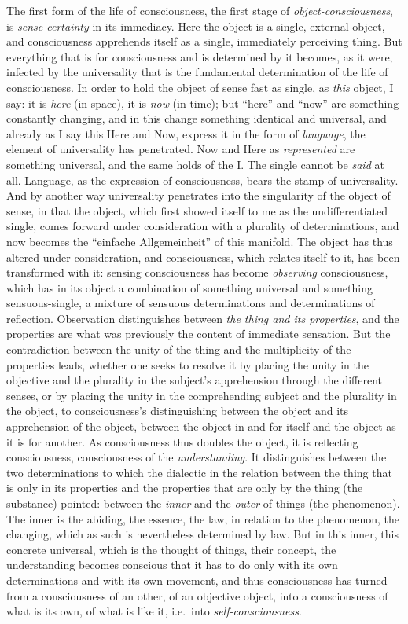 The first form of the life of consciousness, the first stage of
\emph{object-consciousness}, is \emph{sense-certainty} in its immediacy.
Here the object is a single, external object, and consciousness
apprehends itself as a single, immediately perceiving thing. But
everything that is for consciousness and is determined by it becomes,
as it were, infected by the universality that is the fundamental
determination of the life of consciousness. In order to hold the object
of sense fast as single, as \emph{this} object, I say: it is \emph{here}
(in space), it is \emph{now} (in time); but ``here'' and ``now'' are
something constantly changing, and in this change something identical
and universal, and already as I say this Here and Now, express it in
the form of \emph{language}, the element of universality has
penetrated. Now and Here as \emph{represented} are something universal,
and the same holds of the I. The single cannot be \emph{said} at all.
Language, as the expression of consciousness, bears the stamp of
universality. And by another way universality penetrates into the
singularity of the object of sense, in that the object, which first
showed itself to me as the undifferentiated single, comes forward under
consideration with a plurality of determinations, and now becomes the
``einfache Allgemeinheit'' of this manifold. The object has thus altered
under consideration, and consciousness, which relates itself to it, has
been transformed with it: sensing consciousness has become
\emph{observing} consciousness, which has in its object a combination of
something universal and something sensuous-single, a mixture of
sensuous determinations and determinations of reflection. Observation
distinguishes between \emph{the thing and its properties}, and the
properties are what was previously the content of immediate sensation.
But the contradiction between the unity of the thing and the
multiplicity of the properties leads, whether one seeks to resolve it
by placing the unity in the objective and the plurality in the
subject's apprehension through the different senses, or by placing the
unity in the comprehending subject and the plurality in the object, to
consciousness's distinguishing between the object and its apprehension
of the object, between the object in and for itself and the object as
it is for another. As consciousness thus doubles the object, it is
reflecting consciousness, consciousness of the \emph{understanding}. It
distinguishes between the two determinations to which the dialectic in
the relation between the thing that is only in its properties and the
properties that are only by the thing (the substance) pointed: between
the \emph{inner} and the \emph{outer} of things (the phenomenon). The
inner is the abiding, the essence, the law, in relation to the
phenomenon, the changing, which as such is nevertheless determined by
law. But in this inner, this concrete universal, which is the thought of
things, their concept, the understanding becomes conscious that it has
to do only with its own determinations and with its own movement, and
thus consciousness has turned from a consciousness of an other, of an
objective object, into a consciousness of what is its own, of
what is like it, i.e.\ into \emph{self-consciousness}.

